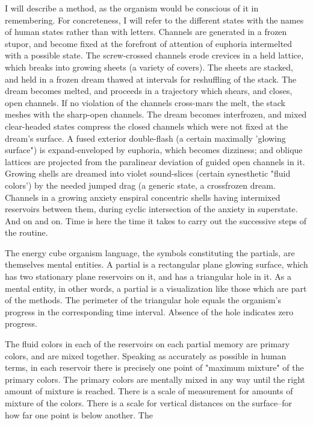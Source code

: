 \documentclass[10pt,twoside]{memoir}
\begin{document}
\begin{enumerate}
{\begin{enumerate}
\begin{sysrules}
\begin{sysrules}
\begin{sysrules}
\begin{sysrules}
{\begin{enumerate}
{I will describe a method, as the organism would be conscious of it in 
remembering. For concreteness, I will refer to the different states with the 
names of human states rather than with letters. Channels are generated in a 
frozen stupor, and become fixed at the forefront of attention of euphoria 
intermelted with a possible state. The screw-crossed channels erode crevices 
in a held lattice, which breaks into growing sheets (a variety of covers). The 
sheets are stacked, and held in a frozen dream thawed at intervals for 
reshuffling of the stack. The dream becomes melted, and proceeds in a 
trajectory which shears, and closes, open channels. If no violation of the 
channels cross-mars the melt, the stack meshes with the sharp-open channels. 
The dream becomes interfrozen, and mixed clear-headed states compress the 
closed channels which were not fixed at the dream's surface. A fused 
exterior double-flash (a certain maximally 'glowing surface") is 
expand-enveloped by euphoria, which becomes dizziness; and oblique 
lattices are projected from the paralinear deviation of guided open channels 
in it. Growing shells are dreamed into violet sound-slices (certain synesthetic 
"fluid colors') by the needed jumped drag (a generic state}, a crossfrozen 
dream. Channels in a growing anxiety enspiral concentric shells having 
intermixed reservoirs between them, during cyclic intersection of the anxiety 
in superstate. And on and on. Time is here the time it takes to carry out the 
successive steps of the routine. 

The energy cube organism language, the symbols constituting the 
partials, are themselves mental entities. A partial is a rectangular plane 
glowing surface, which has two stationary plane reservoirs on it, and has a 
triangular hole in it. As a mental entity, in other words, a partial is a 
visualization like those which are part of the methods. The perimeter of the 
triangular hole equals the organism's progress in the corresponding time 
interval. Absence of the hole indicates zero progress. 

The fluid colors in each of the reservoirs on each partial memory are 
primary colors, and are mixed together. Speaking as accurately as possible in 
human terms, in each reservoir there is precisely one point of "maximum 
mixture" of the primary colors. The primary colors are mentally mixed in 
any way until the right amount of mixture is reached. There is a scale of 
measurement for amounts of mixture of the colors. There is a scale for 
vertical distances on the surface--for how far one point is below another. The 



\end{enumerate}}
\end{sysrules}
\end{sysrules}
\end{sysrules}
\end{sysrules}
\end{enumerate}}
\end{enumerate}
\end{document}

